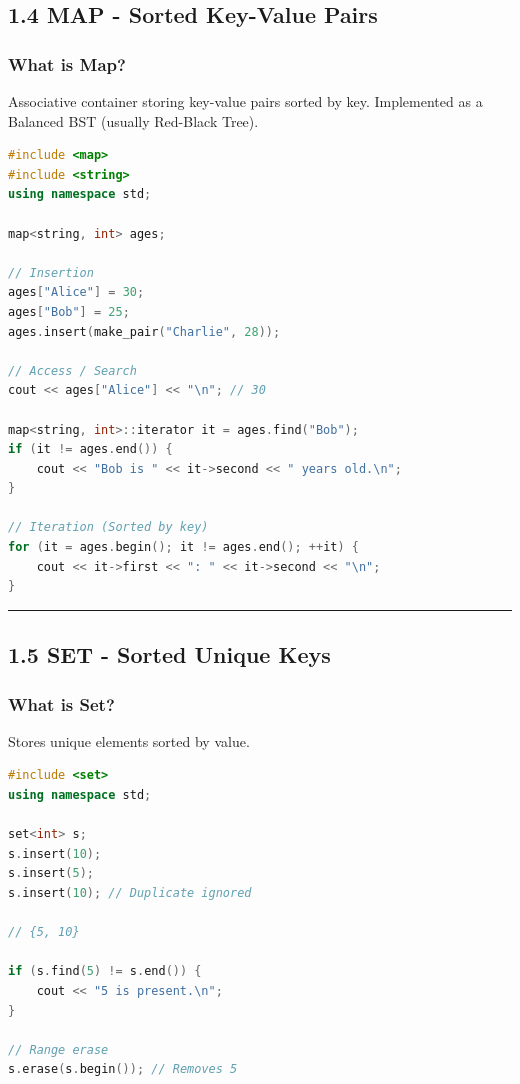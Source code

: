 \hypertarget{map---sorted-key-value-pairs}{%
\subsection{1.4 MAP - Sorted Key-Value
Pairs}\label{map---sorted-key-value-pairs}}

\hypertarget{what-is-map}{%
\subsubsection{What is Map?}\label{what-is-map}}

Associative container storing key-value pairs sorted by key. Implemented
as a Balanced BST (usually Red-Black Tree).

\begin{lstlisting}[language={C++}]
#include <map>
#include <string>
using namespace std;

map<string, int> ages;

// Insertion
ages["Alice"] = 30;
ages["Bob"] = 25;
ages.insert(make_pair("Charlie", 28));

// Access / Search
cout << ages["Alice"] << "\n"; // 30

map<string, int>::iterator it = ages.find("Bob");
if (it != ages.end()) {
    cout << "Bob is " << it->second << " years old.\n";
}

// Iteration (Sorted by key)
for (it = ages.begin(); it != ages.end(); ++it) {
    cout << it->first << ": " << it->second << "\n";
}
\end{lstlisting}

\begin{center}\rule{0.5\linewidth}{0.5pt}\end{center}

\hypertarget{set---sorted-unique-keys}{%
\subsection{1.5 SET - Sorted Unique
Keys}\label{set---sorted-unique-keys}}

\hypertarget{what-is-set}{%
\subsubsection{What is Set?}\label{what-is-set}}

Stores unique elements sorted by value.

\begin{lstlisting}[language={C++}]
#include <set>
using namespace std;

set<int> s;
s.insert(10);
s.insert(5);
s.insert(10); // Duplicate ignored

// {5, 10}

if (s.find(5) != s.end()) {
    cout << "5 is present.\n";
}

// Range erase
s.erase(s.begin()); // Removes 5
\end{lstlisting}

